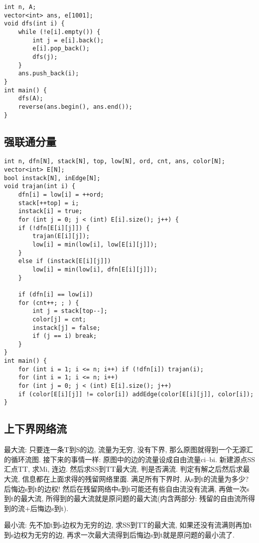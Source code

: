 \documentclass{article}
\begin{document}
\begin{lstlisting}
int n, A;
vector<int> ans, e[1001];
void dfs(int i) {
    while (!e[i].empty()) {
        int j = e[i].back();
        e[i].pop_back();
        dfs(j);
    }
    ans.push_back(i);
}
int main() {
    dfs(A);
    reverse(ans.begin(), ans.end());
}
\end{lstlisting}

\subsection{强联通分量}

\begin{lstlisting}
int n, dfn[N], stack[N], top, low[N], ord, cnt, ans, color[N];
vector<int> E[N];
bool instack[N], inEdge[N];
void trajan(int i) {
    dfn[i] = low[i] = ++ord;
    stack[++top] = i;
    instack[i] = true;
    for (int j = 0; j < (int) E[i].size(); j++) {
    if (!dfn[E[i][j]]) {
        trajan(E[i][j]);
        low[i] = min(low[i], low[E[i][j]]);
    }
    else if (instack[E[i][j]])
        low[i] = min(low[i], dfn[E[i][j]]);
    }

    if (dfn[i] == low[i])
    for (cnt++; ; ) {
        int j = stack[top--];
        color[j] = cnt;
        instack[j] = false;
        if (j == i) break;
    }
}
int main() {
    for (int i = 1; i <= n; i++) if (!dfn[i]) trajan(i);
    for (int i = 1; i <= n; i++)
    for (int j = 0; j < (int) E[i].size(); j++)
    if (color[E[i][j]] != color[i]) addEdge(color[E[i][j]], color[i]);
}
\end{lstlisting}

\subsection{上下界网络流}

最大流: 只要连一条T到S的边, 流量为无穷, 没有下界,
那么原图就得到一个无源汇的循环流图. 接下来的事情一样:
原图中的边的流量设成自由流量ci--bi. 新建源点SS汇点TT, 求Mi, 连边.
然后求SS到TT最大流, 判是否满流. 判定有解之后然后求最大流,
信息都在上面求得的残留网络里面. 满足所有下界时, 从s到t的流量为多少?
后悔边s到t的边权! 然后在残留网络中s到t可能还有些自由流没有流满,
再做一次s到t的最大流, 所得到的最大流就是原问题的最大流(内含两部分:
残留的自由流所得到的流+后悔边s到t).

最小流: 先不加t到s边权为无穷的边, 求SS到TT的最大流,
如果还没有流满则再加t到s边权为无穷的边,
再求一次最大流得到后悔边s到t就是原问题的最小流了.
\end{document}
